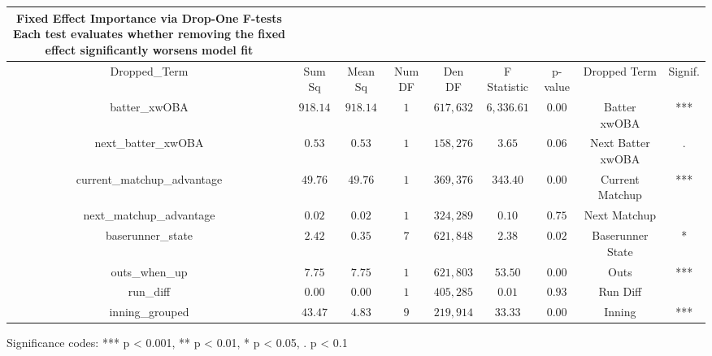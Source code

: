 \setlength{\LTpost}{0mm}
\begin{longtable}{ccccccccc}
\caption*{
{\large \textbf{Fixed Effect Importance via Drop-One F-tests}} \\ 
{\small Each test evaluates whether removing the fixed effect significantly worsens model fit}
} \\ 
\toprule
Dropped\_Term & Sum Sq & Mean Sq & Num DF & Den DF & F Statistic & p-value & Dropped Term & Signif. \\ 
\midrule\addlinespace[2.5pt]
batter\_xwOBA & $918.14$ & $918.14$ & $1$ & $617,632$ & $6,336.61$ & $0.00$ & Batter xwOBA & *** \\ 
next\_batter\_xwOBA & $0.53$ & $0.53$ & $1$ & $158,276$ & $3.65$ & $0.06$ & Next Batter xwOBA & . \\ 
current\_matchup\_advantage & $49.76$ & $49.76$ & $1$ & $369,376$ & $343.40$ & $0.00$ & Current Matchup & *** \\ 
next\_matchup\_advantage & $0.02$ & $0.02$ & $1$ & $324,289$ & $0.10$ & $0.75$ & Next Matchup &  \\ 
baserunner\_state & $2.42$ & $0.35$ & $7$ & $621,848$ & $2.38$ & $0.02$ & Baserunner State & * \\ 
outs\_when\_up & $7.75$ & $7.75$ & $1$ & $621,803$ & $53.50$ & $0.00$ & Outs & *** \\ 
run\_diff & $0.00$ & $0.00$ & $1$ & $405,285$ & $0.01$ & $0.93$ & Run Diff &  \\ 
inning\_grouped & $43.47$ & $4.83$ & $9$ & $219,914$ & $33.33$ & $0.00$ & Inning & *** \\ 
\bottomrule
\end{longtable}
\begin{minipage}{\linewidth}
Significance codes: *** p \textless{} 0.001, ** p \textless{} 0.01, * p \textless{} 0.05, . p \textless{} 0.1\\
\end{minipage}


